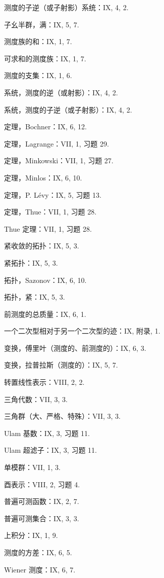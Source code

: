 测度的子逆（或子射影）系统：IX, 4, 2.

子幺半群，满：IX, 5, 7.

测度族的和：IX, 1, 7.

可求和的测度族：IX, 1, 7.

测度的支集：IX, 1, 6.

系统，测度的逆（或射影）：IX, 4, 2.

系统，测度的子逆（或子射影）：IX, 4, 2.

定理，Bochner：IX, 6, 12.

定理，Lagrange：VII, 1, 习题 29.

定理，Minkowski：VII, 1, 习题 27.

定理，Minlos：IX, 6, 10.

定理，P. Lévy：IX, 5, 习题 13.

定理，Thue：VII, 1, 习题 28.

Thue 定理：VII, 1, 习题 28.

紧收敛的拓扑：IX, 5, 3.

紧拓扑：IX, 5, 3.

拓扑，Sazonov：IX, 6, 10.

拓扑，紧：IX, 5, 3.

前测度的总质量：IX, 6, 1.

一个二次型相对于另一个二次型的迹：IX, 附录, 1.

变换，傅里叶（测度的、前测度的）：IX, 6, 3.

变换，拉普拉斯（测度的）：IX, 5, 7.

转置线性表示：VIII, 2, 2.

三角代数：VII, 3, 3.

三角群（大、严格、特殊）：VII, 3, 3.

Ulam 基数：IX, 3, 习题 11.

Ulam 超滤子：IX, 3, 习题 11.

单模群：VII, 1, 3.

酉表示：VIII, 2, 习题 4.

普遍可测函数：IX, 2, 7.

普遍可测集合：IX, 3, 3.

上积分：IX, 1, 9.

测度的方差：IX, 6, 5.

Wiener 测度：IX, 6, 7.




